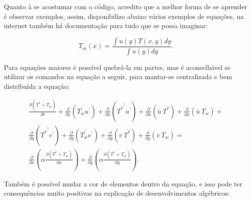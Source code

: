 Quanto à se acostumar com o código, acredito que a melhor forma de se aprender é observar exemplos, assim, disponibilizo abaixo vários exemplos de equações, na internet também há documentação para tudo que se possa imaginar: 

\begin{equation}
T_m(x) = \frac{\int u(y) T(x , y) dy}{\int u(y)  dy} .
\end{equation}

Para equações maiores é possível quebrá-la em partes, mas é aconselhável se utilizar os comandos na equação a seguir, para mantar-se centralizada e bem distribuída a equação:

\begin{center}
\begin{equation}
	\begin{split}
	\frac{\partial ( \overline{ T^\ast + T_w } ) }{\partial t} +
	\frac{\partial{}}{\partial{x}} \left(\overline{T_w^{\prime} u^{\prime}}\right) +\frac{\partial{}}{\partial{x}} \left(\overline{{T^{\ast}}^{\prime} u^{\prime}}\right)
	+\frac{\partial{}}{\partial{x}}\left(\overline{u} \ \overline{T^{\ast}}\right)+ 
	\frac{\partial{}}{\partial{x}}\left(\overline{u} \ \overline{T_w}\right)+ 
	\\
	\frac{\partial{}}{\partial{y}} \left(\overline{{T^{\ast}}^{\prime} v^{\prime}}\right)+
	\frac{\partial{}}{\partial{y}} \left(\overline{T_w^\prime v^\prime}\right) + \frac{\partial{}}{\partial{y}}\left(\overline{v} \ \overline{T^\ast}\right) +
	\frac{\partial{}}{\partial{y}}\left(\overline{v} \ \overline{T_w}\right) 
	= 
	\\
	{\frac{\partial{}}{\partial{x}}} \left(\alpha {\frac{\partial{\overline{(T^\ast + T_w)}}}{\partial{x}}} \right) +
	{\frac{\partial{}}{\partial{y}}} \left(\alpha {\frac{\partial{\overline{(T^\ast + T_w)}}}{\partial{y}}} \right) .
	\end{split}
\end{equation}
\end{center}

Também é possível mudar a cor de elementos dentro da equação, e isso pode ter consequências muito positivas na explicação de desenvolvimentos algébricos:

